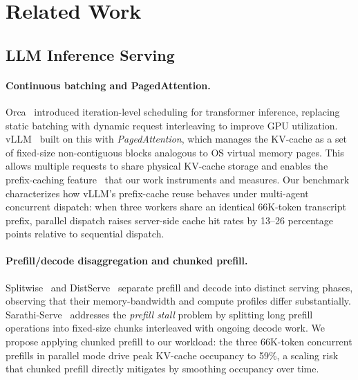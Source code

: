 
\section{Related Work}
\label{sec:related}

\subsection{LLM Inference Serving}

\paragraph{Continuous batching and PagedAttention.}
Orca~\cite{yu2022orca} introduced iteration-level scheduling for transformer
inference, replacing static batching with dynamic request interleaving to
improve GPU utilization.  vLLM~\cite{kwon2023vllm} built on this with
\emph{PagedAttention}, which manages the KV-cache as a set of fixed-size
non-contiguous blocks analogous to OS virtual memory pages.  This allows
multiple requests to share physical KV-cache storage and enables the
prefix-caching feature~\cite{vllm2024prefixcache} that our work
instruments and measures.  Our benchmark characterizes how vLLM's
prefix-cache reuse behaves under multi-agent concurrent dispatch: when
three workers share an identical 66K-token transcript prefix, parallel
dispatch raises server-side cache hit rates by 13–26 percentage points
relative to sequential dispatch.

\paragraph{Prefill/decode disaggregation and chunked prefill.}
Splitwise~\cite{patel2024splitwise} and DistServe~\cite{zhong2024distserve}
separate prefill and decode into distinct serving phases, observing that
their memory-bandwidth and compute profiles differ substantially.
Sarathi-Serve~\cite{agrawal2024sarathiserve} addresses the \emph{prefill
stall} problem by splitting long prefill operations into fixed-size chunks
interleaved with ongoing decode work.  We propose applying
chunked prefill to our workload: the three 66K-token concurrent prefills in
parallel mode drive peak KV-cache occupancy to 59\%, a scaling risk that
chunked prefill directly mitigates by smoothing occupancy over time.

